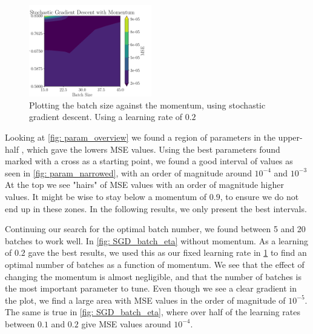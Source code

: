 \begin{figure}[ht!]
    \centering
    \includegraphics[width = 0.47575\textwidth]{../figs/SGD_batch_gamma.pdf}
    \caption{Plotting the batch size against the momentum, using stochastic gradient descent. Using a learning rate of $0.2$}
    \label{fig: SGD_batch_gamma}
\end{figure}

Looking at \cref{fig: param_overview} we found a region of parameters  in the upper-half , which gave the lowers MSE values. Using the best parameters found marked with a cross as a starting point, we found a good interval of values as seen in \cref{fig: param_narrowed}, with an order of magnitude around $10^{-4}$ and $10^{-3}$ At the top we see "hairs" of MSE values with an order of magnitude higher values. It might be wise to stay below a momentum of \(0.9\), to ensure we do not end up in these zones. In the following results, we only present the best intervals.

Continuing our search for the optimal batch number, we found between 5 and 20 batches to work well. In \cref{fig: SGD_batch_eta} without momentum. As a learning of $0.2$ gave the best results, we used this as our fixed learning rate in \cref{fig: SGD_batch_gamma} to find an optimal number of batches as a function of momentum. We see that the effect of changing the momentum is almost negligible, and that the number of batches is the most important parameter to tune. Even though we see a clear gradient in the plot, we find a large area with MSE values in the order of magnitude of \(10^{-5}\). The same is true in \cref{fig: SGD_batch_eta}, where over half of the learning rates between $0.1$ and $0.2$ give MSE values around \(10^{-4}\).

